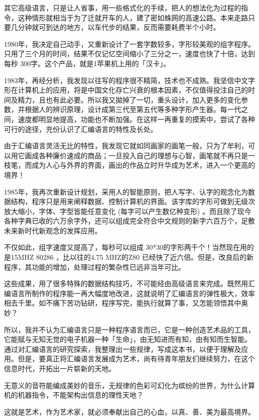 \documentclass{ctexart}
\begin{document}
其它高级语言，只是让人省事，用一些格式化的手续，把人的想法化为过程的指令，这种情形就相当于为了迁就开车的人，建了密如蛛网的高速公路。本来走路只要几分钟就可到达的地方，以车代步的结果，反而需要耗费半个小时。

1980年，我决定自己动手，又重新设计了一套字数较多，字形较美观的组字程序。只用了三个月的时间，结果不仅记忆空间缩小了三分之一，速度也快了十倍，达到每秒 300字。这个产品，就是1苹果机上用的「汉卡」。

1983年，再经分析，我发现以往写的程序很不精简，技术也不成熟。我坚信中文字形在计算机上的应用，将是中国文化存亡兴衰的根本因素，不仅值得投注自己的时间及精力，且也有此必要。所以我又拋掉了一切，重头设计，加入更多的变化参数，并根据人的辨识原理，设计成第三代至第五代等多种字形产生器。每一代之间，速度都明显地提高，功能也不断加强。在这样一再重复的摸索中，尝试了各种可行的途径，充份认识了汇编语言的特性及长处。

由于汇编语言灵活无比的特性，我发现它就如同画家的画笔一般，只为了牟利，可以用它画成各种廉价速成的商品；一旦投入自己的理想与心智，画笔就不再只是一枝笔，而成为人心与外界的界面，画出的作品立时升华成为艺术，进入一个更高的境界！

1985年，我再次重新设计规划，采用人的智能原则，把人写字、认字的观念化为数据结构，程序只是用来阐释数据、控制计算机的界面。该字库的字形可做到无级次放大缩小，字体、字型皆能任意变化 (每字可以产生数亿种变形) 。而且除了现今各种字典已收的六万余字外，还可以组成完全符合中文规则的新字六百万个，足敷未来新时代新观念的发挥应用。

不仅如此，组字速度又提高了，每秒可以组成 30*30的字形两千个！当然现在用的是15MHZ 80286 ，比以往的4.75 MHZ的Z80 已经快了近六倍。但是，改良后的新程序，其功能的增加，处理过程的繁杂性已远非当年可比。

这些成果，用了很多特殊的数据结构技巧，不可能经由高级语言来完成。既然用汇编语言所制作的程序能一再大幅度地改进，这就说明了汇编语言的弹性极大，效率相去千里。如不痛下苦功钻研，程序写完，能执行就算了事，又怎能领悟其中奥妙？

所以，我并不认为汇编语言只是一种程序语言而已，它是一种创造艺术品的工具，它能赋与无知无觉的电子机器一种「生命」，由无知进而有知，由有知而生智能。通过对汇编语言的研究探索，我整理出一些规律，写成这本书，以便于理解及应用。但是，要真正将汇编语言发展成为艺术，尚有待青年朋友们继续努力，在这个信息时代，开拓出一片崭新的天地。

无意义的音符能编成美妙的音乐，无规律的色彩可幻化为缤纷的世界，为什么计算机的机器指令，不能架构出信息的理性天地？

这就是艺术，作为艺术家，就必须奉献出自己的心血，以真、善、美为最高境界。 
\end{document}
